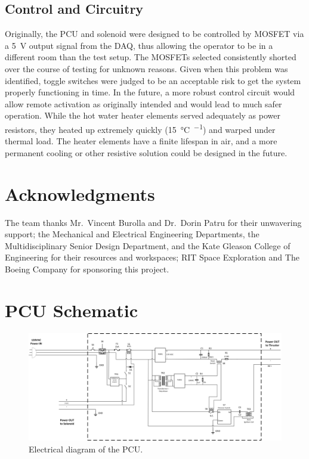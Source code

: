 \documentclass[journal]{IEEEtran}
\begin{document}
\subsection{Control and Circuitry}
Originally, the PCU and solenoid were designed to be controlled by MOSFET via a \SI{5}{\volt} output signal from the DAQ, thus allowing the operator to be in a different room than the test setup. The MOSFETs selected consistently shorted over the course of testing for unknown reasons. Given when this problem was identified, toggle switches were judged to be an acceptable risk to get the system properly functioning in time. In the future, a more robust control circuit would allow remote activation as originally intended and would lead to much safer operation. 
While the hot water heater elements served adequately as power resistors, they heated up extremely quickly (\SI{15}{\celsius\per\sec}) and warped under thermal load. The heater elements have a finite lifespan in air, and a more permanent cooling or other resistive solution could be designed in the future. 


\section*{Acknowledgments}
The team thanks Mr.~Vincent Burolla and Dr.~Dorin Patru for their unwavering support; the Mechanical and Electrical Engineering Departments, the Multidisciplinary Senior Design Department, and the Kate Gleason College of Engineering for their resources and workspaces; RIT Space Exploration and The Boeing Company for sponsoring this project.





\onecolumn
\appendices{}
\section{PCU Schematic}
\begin{figure}[h!]
  \includegraphics[angle=90,height=.8\vsize,keepaspectratio]{figs/PCU_Schematic_No_AI_4_27_new.png}
  \caption{Electrical diagram of the PCU.}
\label{fig:pcu-schematic}


\end{figure}
\end{document}
